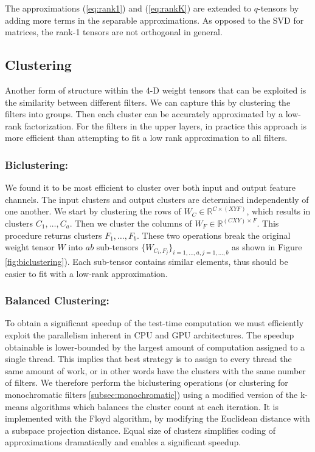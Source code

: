 The approximations (\ref{eq:rank1}) and (\ref{eq:rankK}) are extended to $q$-tensors 
by adding more terms in the separable approximations.
As opposed to the SVD for matrices, the rank-1 tensors are not orthogonal in general. 


\subsection{Clustering}\label{subsec:clustering}
Another form of structure within the 4-D weight tensors that can be exploited is the similarity between different filters. 
We can capture this by clustering the filters into groups. Then each cluster can
be accurately approximated by a low-rank factorization. For the
filters in the upper layers, in practice this approach is more
efficient than attempting to fit a low rank approximation to all
filters. 

\vspace{-0.3cm}
\subsubsection{Biclustering:}\label{subsubsec:biclustering}
We found it to be most efficient to cluster
over both input and output feature channels. The input clusters and output clusters are determined independently of one another. We start by clustering the
rows of $W_C \in \mathbb{R}^{C \times (XYF)}$, which results in
clusters $C_1, \dots, C_a$. Then we cluster the columns of $W_F  \in
\mathbb{R}^{(CXY) \times F}$. This procedure returns clusters $F_1,
\dots, F_b$. These two operations break the original weight tensor $W$
into $ab$ sub-tensors $\{W_{C_i, F_j}\}_{i = 1, \dots, a, j = 1,
  \dots, b}$ as shown in Figure \ref{fig:biclustering}). Each
sub-tensor contains similar elements, thus should be easier to
fit with a low-rank approximation. 

\vspace{-0.3cm}
\subsubsection{Balanced Clustering:}
To obtain a significant speedup of the test-time computation we must
efficiently exploit the parallelism inherent in CPU and GPU
architectures. The speedup obtainable is lower-bounded by the largest
amount of computation assigned to a single thread. This implies that
best strategy is to assign to every thread the same amount of work, or in other words
have the clusters with the same number of filters. 
We therefore perform the biclustering operations (or clustering 
for monochromatic filters \ref{subsec:monochromatic}) using a modified
version of the k-means algorithms which balances the cluster count at
each iteration. 
It is implemented with the Floyd algorithm, by modifying the Euclidean distance
with a subspace projection distance.
Equal size of clusters simplifies coding of approximations dramatically and enables a
significant speedup. 


